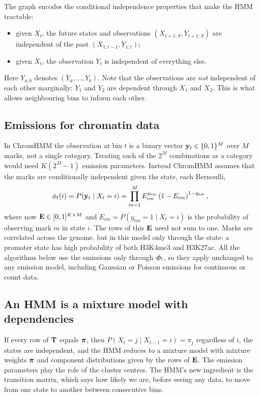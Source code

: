 The graph encodes the conditional independence properties that make the HMM tractable:
\begin{itemize}
  \item given $X_t$, the future states and observations $(X_{t+1:S},Y_{t+1:S})$ are independent of the past $(X_{1:t-1},Y_{1:t})$;
  \item given $X_t$, the observation $Y_t$ is independent of everything else.
\end{itemize}
Here $Y_{a:b}$ denotes $(Y_a,\dots,Y_b)$. Note that the observations are \emph{not} independent of each other marginally: $Y_1$ and $Y_2$ are dependent through $X_1$ and $X_2$. This is what allows neighbouring bins to inform each other.

\subsection{Emissions for chromatin data}

In ChromHMM the observation at bin $t$ is a binary vector $\mathbf{y}_t\in\{0,1\}^M$ over $M$ marks, not a single category. Treating each of the $2^M$ combinations as a category would need $K(2^M-1)$ emission parameters. Instead ChromHMM assumes that the marks are conditionally independent given the state, each Bernoulli,
\begin{equation}
  \phi_t(i) = P(\mathbf{y}_t\mid X_t=i) = \prod_{m=1}^M E_{im}^{y_{tm}}\left(1-E_{im}\right)^{1-y_{tm}},
  \label{eq:bernoulli_emission}
\end{equation}
where now $\mathbf{E}\in[0,1]^{K\times M}$ and $E_{im}=P(y_{tm}=1\mid X_t=i)$ is the probability of observing mark $m$ in state $i$. The rows of this $\mathbf{E}$ need not sum to one. Marks are correlated across the genome, but in this model only through the state: a promoter state has high probability of both H3K4me3 and H3K27ac. All the algorithms below use the emissions only through $\boldsymbol{\phi}_t$, so they apply unchanged to any emission model, including Gaussian or Poisson emissions for continuous or count data.

\subsection{An HMM is a mixture model with dependencies}

If every row of $\mathbf{T}$ equals $\boldsymbol{\pi}$, then $P(X_t=j\mid X_{t-1}=i)=\pi_j$ regardless of $i$, the states are independent, and the HMM reduces to a mixture model with mixture weights $\boldsymbol{\pi}$ and component distributions given by the rows of $\mathbf{E}$. The emission parameters play the role of the cluster centres. The HMM's new ingredient is the transition matrix, which says how likely we are, before seeing any data, to move from one state to another between consecutive bins.

